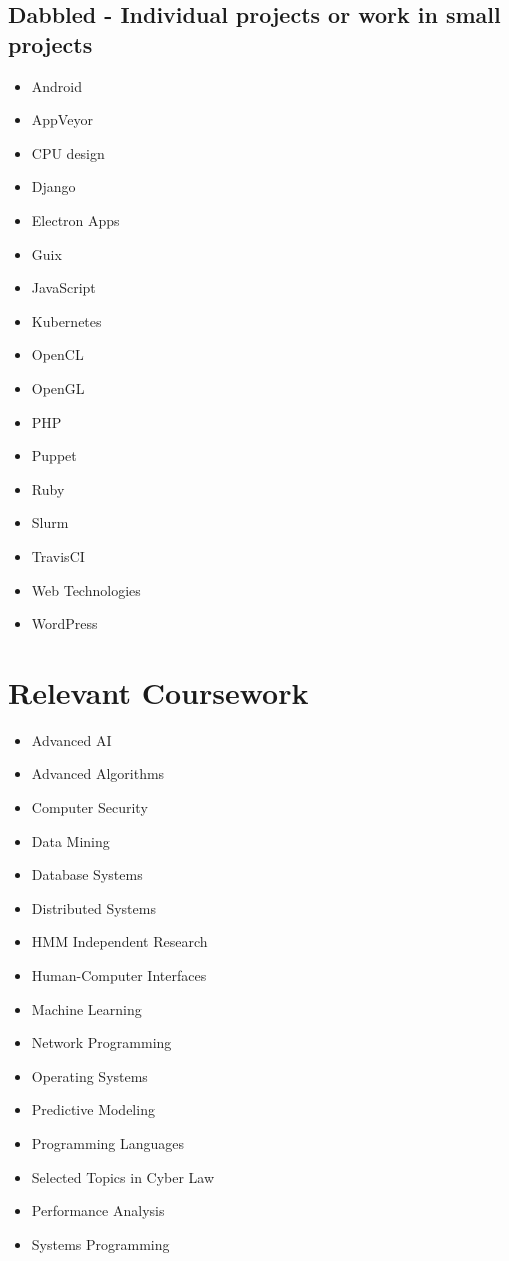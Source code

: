 \documentclass[10pt,a4paper,sans]{moderncv}        %
\begin{document}
\subsection{Dabbled - Individual projects or work in small projects}

\begin{multicols}{3}
\begin{itemize}

\item Android
\item AppVeyor
\item CPU design
\item Django
\item Electron Apps
\item Guix
\item JavaScript
\item Kubernetes
\item OpenCL
\item OpenGL
\item PHP
\item Puppet
\item Ruby
\item Slurm
\item TravisCI
\item Web Technologies
\item WordPress


\end{itemize}
\end{multicols}


\section{Relevant Coursework}

\begin{multicols}{3}
\begin{itemize}

\item Advanced AI
\item Advanced Algorithms
\item Computer Security
\item Data Mining
\item Database Systems
\item Distributed Systems
\item HMM Independent Research
\item Human-Computer Interfaces
\item Machine Learning
\item Network Programming
\item Operating Systems
\item Predictive Modeling
\item Programming Languages
\item Selected Topics in Cyber Law
\item Performance Analysis
\item Systems Programming

\end{itemize}
\end{multicols}
\end{document}
